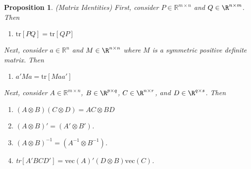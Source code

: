 \documentclass[12pt]{article}
\theoremstyle{plain}
\newtheorem{prop}[thm]{Proposition}
\theoremstyle{definition}
\theoremstyle{remark}
\newcommand{\Rn}{\mathbb{R}^n}
\newcommand{\Rmn}{\mathbb{R}^{m\times n}}
\begin{document}
\begin{prop}\emph{(Matrix Identities)}
First, consider $P\in\Rmn$ and $Q\in\R^{n\times m}$. Then
\begin{enumerate}
  \item[\emph{(i)}]
    $\text{tr}[PQ]=\text{tr}[QP]$
\end{enumerate}
Next, consider $a\in\Rn$ and $M\in\R^{n\times n}$ where $M$ is a
symmetric positive definite matrix. Then
\begin{enumerate}
  \item[\emph{(ii)}]
    $a'Ma = \text{tr}[Maa']$
\end{enumerate}
Next, consider $A\in\Rmn$, $B\in\R^{p\times q}$, $C\in\R^{n\times r}$,
and $D\in\R^{q\times s}$. Then
\begin{enumerate}
  \item[\emph{(iii)}] $(A \otimes B)(C \otimes D) = AC \otimes BD$
  \item[\emph{(iv)}] $(A\otimes B)' = (A' \otimes B')$.
  \item[\emph{(v)}] $(A\otimes B)^{-1} = (A^{-1} \otimes B^{-1})$.
  \item[\emph{(vi)}]
    tr$\left[A'BCD'\right] = \text{vec}(A)' (D \otimes B) \text{vec}(C)$.
\end{enumerate}
\end{prop}
\clearpage
\end{document}
